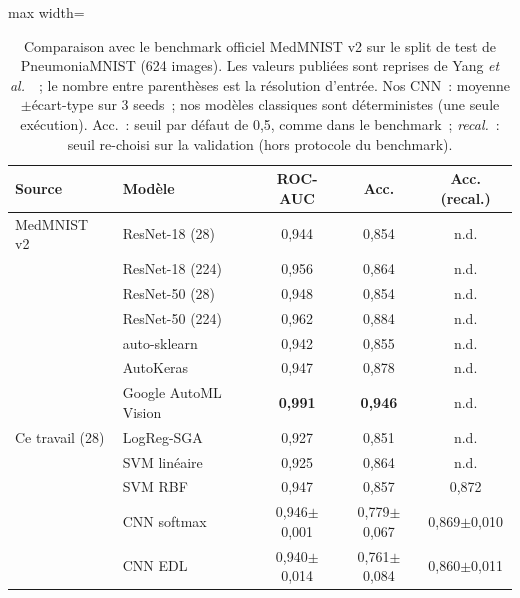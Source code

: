 \begin{table}[t]
\centering
\small
\caption{Comparaison avec le benchmark officiel MedMNIST v2 sur le split de test de PneumoniaMNIST (624 images). Les
valeurs publiées sont reprises de Yang \emph{et al.}~\cite{yang2023medmnist}~; le nombre entre parenthèses est la
résolution d'entrée. Nos CNN~: moyenne$\pm$écart-type sur 3 seeds~; nos modèles classiques sont déterministes
(une seule exécution). Acc.~: seuil par défaut de 0,5, comme dans le benchmark~; \emph{recal.}~: seuil re-choisi sur
la validation (hors protocole du benchmark).}
\label{tab:benchmark}
\begin{adjustbox}{max width=\textwidth}
\begin{tabular}{llccc}
\toprule
Source & Modèle & ROC-AUC & Acc. & Acc. (recal.) \\
\midrule
MedMNIST v2~\cite{yang2023medmnist} & ResNet-18 (28) & 0,944 & 0,854 & n.d. \\
 & ResNet-18 (224) & 0,956 & 0,864 & n.d. \\
 & ResNet-50 (28) & 0,948 & 0,854 & n.d. \\
 & ResNet-50 (224) & 0,962 & 0,884 & n.d. \\
 & auto-sklearn & 0,942 & 0,855 & n.d. \\
 & AutoKeras & 0,947 & 0,878 & n.d. \\
 & Google AutoML Vision & \textbf{0,991} & \textbf{0,946} & n.d. \\
\midrule
Ce travail (28) & LogReg-SGA & 0,927 & 0,851 & n.d. \\
 & SVM linéaire & 0,925 & 0,864 & n.d. \\
 & SVM RBF & 0,947 & 0,857 & 0,872 \\
 & CNN softmax & 0,946$\pm$0,001 & 0,779$\pm$0,067 & 0,869$\pm$0,010 \\
 & CNN EDL & 0,940$\pm$0,014 & 0,761$\pm$0,084 & 0,860$\pm$0,011 \\
\bottomrule
\end{tabular}
\end{adjustbox}
\end{table}
